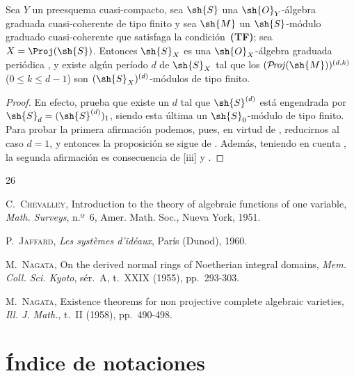 \documentclass[oneside,10pt]{amsart}
\renewcommand{\leq}{\leqslant}
\def\shProj{\mathcal{P}\!\mathit{roj}}
\newcommand{\oldpage}[2][]{\marginnote{\normalfont\footnotesize\textbf{#1}~|~#2}\ignorespaces}
\let\EGAOriginalLabel\label
\renewcommand{\label}[1]{\phantomsection\EGAOriginalLabel{#1}}
\begin{document}
\begin{proposition}[8.14.14]
\label{II.8.14.14}
Sea $Y$ un preesquema cuasi-compacto, sea $\sh{S}$ una $\sh{O}_Y$-álgebra graduada cuasi-coherente de tipo finito y sea $\sh{M}$ un $\sh{S}$-módulo graduado cuasi-coherente que satisfaga la condición~\textup{\textbf{(TF)}};
sea $X=\Proj(\sh{S})$.
Entonces $\sh{S}_X$ es una $\sh{O}_X$-álgebra graduada periódica \textup{}, y existe
\oldpage[II]{203}
algún período $d$ de $\sh{S}_X$ tal que los $(\shProj(\sh{M}))^{(d,k)}$ ($0\leq k\leq d-1$) son $(\sh{S}_X)^{(d)}$-módulos de tipo finito.
\end{proposition}

\begin{proof}
En efecto,  prueba que existe un $d$ tal que $\sh{S}^{(d)}$ está engendrada por $\sh{S}_d=(\sh{S}^{(d)})_1$, siendo esta última un $\sh{S}_0$-módulo de tipo finito.
Para probar la primera afirmación podemos, pues, en virtud de , reducirnos al caso $d=1$, y entonces la proposición se sigue de .
Además, teniendo en cuenta , la segunda afirmación es consecuencia de [iii] y .
\end{proof}
\clearpage
\null
\thispagestyle{empty}
\clearpage
\oldpage[II]{205}
{}
\renewcommand{\refname}{Bibliografía \textit{(continuación)}}

\begin{thebibliography}{26}

C.~\textsc{Chevalley},
Introduction to the theory of algebraic functions of one variable,
\emph{Math. Surveys}, n.º~6, Amer. Math. Soc., Nueva York, 1951.

P.~\textsc{Jaffard},
\emph{Les systèmes d'idéaux}, París (Dunod), 1960.

M.~\textsc{Nagata},
On the derived normal rings of Noetherian integral domains,
\emph{Mem. Coll. Sci. Kyoto}, sér.~A, t.~XXIX (1955), pp.~293-303.

M.~\textsc{Nagata},
Existence theorems for non projective complete algebraic varieties,
\emph{Ill. J. Math.}, t.~II (1958), pp.~490-498.

\end{thebibliography}
\clearpage
\oldpage[II]{206}
\clearpage
\oldpage[II]{207}
{}
\section*{Índice de notaciones}
\end{document}
